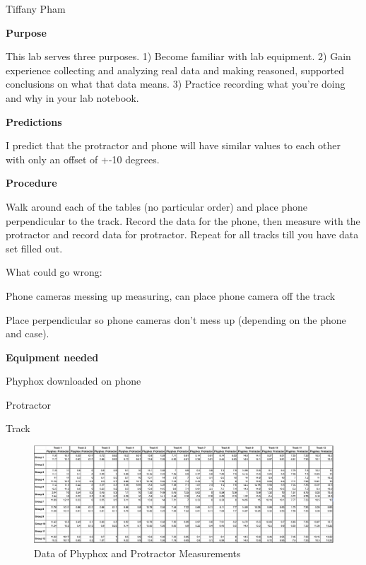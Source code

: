 \documentclass[idxtotoc,hyperref,openany]{labbook} %
\begin{document}

\vspace{-5mm}
Tiffany Pham

\vspace{-5mm}
\textbf{Purpose}

This lab serves three purposes. 1) Become familiar with lab equipment. 2) Gain experience
collecting and analyzing real data and making reasoned, supported conclusions on what that data
means. 3) Practice recording what you’re doing and why in your lab notebook.

\hfill \break
\textbf{Predictions}

I predict that the protractor and phone will have similar values to each other with only an offset of +-10 degrees.

\hfill \break
\textbf{Procedure}

Walk around each of the tables (no particular order) and place phone perpendicular to the track. Record the data for the phone, then measure with the protractor and record data for protractor. Repeat for all tracks till you have data set filled out.

\hfill \break 
What could go wrong:

Phone cameras messing up measuring, can place phone camera off the track

Place perpendicular so phone cameras don't mess up (depending on the phone and case).

\hfill \break
\textbf{Equipment needed}

Phyphox downloaded on phone

Protractor

Track




\begin{figure}[H] %
\begin{center}
\includegraphics[width=1.25\linewidth]{images/PhyphoxProtractorSpreadsheet.png}
\end{center}
\caption{Data of Phyphox and Protractor Measurements}
\label{fig:Data of Phyphox and Protractor Measurements}
\end{figure}
\end{document}
